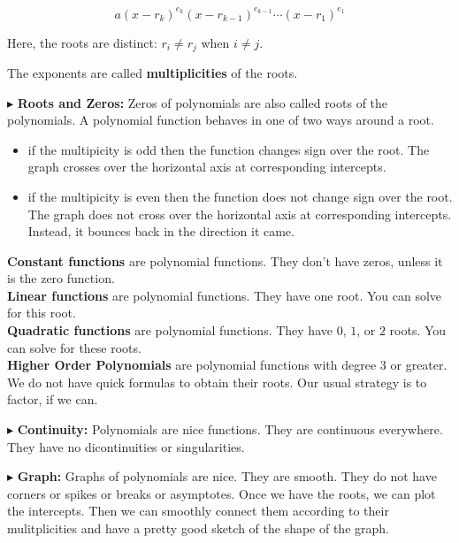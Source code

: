 \documentclass{ximera}
\begin{document}
\[   a (x - r_k)^{e_k} (x - r_{k-1})^{e_{k-1}} \cdots (x - r_1)^{e_1}             \]


Here, the roots are distinct:  $r_i \ne r_j$ when $i \ne j$.

The exponents are called \textbf{multiplicities} of the roots. 






$\blacktriangleright$ \textbf{Roots and Zeros:}   Zeros of polynomials are also called roots of the polynomials.  A polynomial function behaves in one of two ways around a root.

\begin{itemize}
\item if the multipicity is odd then the function changes sign over the root.  The graph crosses over the horizontal axis at corresponding intercepts.
\item if the multipicity is even then the function does not change sign over the root.  The graph does not cross over the horizontal axis at corresponding intercepts. Instead, it bounces back in the direction it came.
\end{itemize}


\textbf{Constant functions} are polynomial functions.  They don't have zeros, unless it is the zero function.  \\


\textbf{Linear functions} are polynomial functions. They have one root.  You can solve for this root. \\


\textbf{Quadratic functions} are polynomial functions. They have $0$, $1$, or $2$ roots.  You can solve for these roots. \\


\textbf{Higher Order Polynomials} are polynomial functions with degree $3$ or greater.  We do not have quick formulas to obtain their roots.  Our usual strategy is to factor, if we can.  





$\blacktriangleright$ \textbf{Continuity:}  Polynomials are nice functions.  They are continuous everywhere.  They have no dicontinuities or singularities.



$\blacktriangleright$ \textbf{Graph:} Graphs of polynomials are nice.  They are smooth.  They do not have corners or spikes or breaks or asymptotes. Once we have the roots, we can plot the intercepts.  Then we can smoothly connect them according to their mulitplicities and have a pretty good sketch of the shape of the graph.
\end{document}
